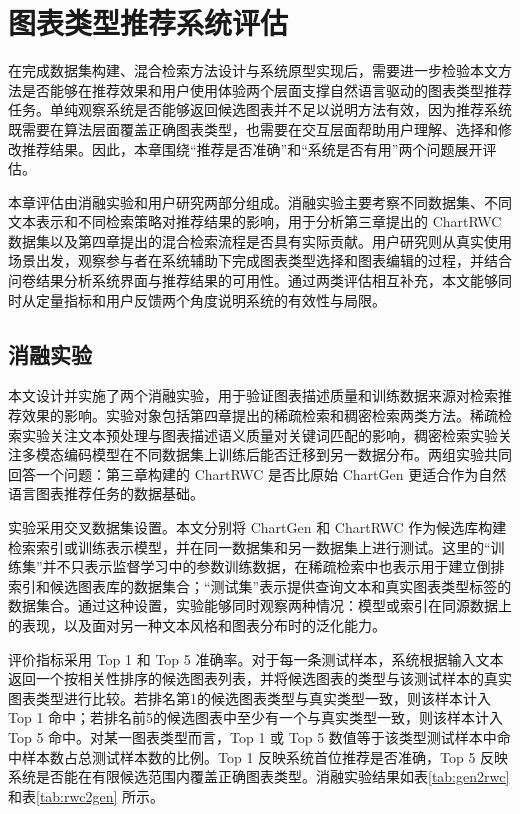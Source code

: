 \section{图表类型推荐系统评估}

在完成数据集构建、混合检索方法设计与系统原型实现后，需要进一步检验本文方法是否能够在推荐效果和用户使用体验两个层面支撑自然语言驱动的图表类型推荐任务。单纯观察系统是否能够返回候选图表并不足以说明方法有效，因为推荐系统既需要在算法层面覆盖正确图表类型，也需要在交互层面帮助用户理解、选择和修改推荐结果。因此，本章围绕“推荐是否准确”和“系统是否有用”两个问题展开评估。

本章评估由消融实验和用户研究两部分组成。消融实验主要考察不同数据集、不同文本表示和不同检索策略对推荐结果的影响，用于分析第三章提出的 ChartRWC 数据集以及第四章提出的混合检索流程是否具有实际贡献。用户研究则从真实使用场景出发，观察参与者在系统辅助下完成图表类型选择和图表编辑的过程，并结合问卷结果分析系统界面与推荐结果的可用性。通过两类评估相互补充，本文能够同时从定量指标和用户反馈两个角度说明系统的有效性与局限。

\subsection{消融实验}

本文设计并实施了两个消融实验，用于验证图表描述质量和训练数据来源对检索推荐效果的影响。实验对象包括第四章提出的稀疏检索和稠密检索两类方法。稀疏检索实验关注文本预处理与图表描述语义质量对关键词匹配的影响，稠密检索实验关注多模态编码模型在不同数据集上训练后能否迁移到另一数据分布。两组实验共同回答一个问题：第三章构建的 ChartRWC 是否比原始 ChartGen 更适合作为自然语言图表推荐任务的数据基础。

实验采用交叉数据集设置。本文分别将 ChartGen 和 ChartRWC 作为候选库构建检索索引或训练表示模型，并在同一数据集和另一数据集上进行测试。这里的“训练集”并不只表示监督学习中的参数训练数据，在稀疏检索中也表示用于建立倒排索引和候选图表库的数据集合；“测试集”表示提供查询文本和真实图表类型标签的数据集合。通过这种设置，实验能够同时观察两种情况：模型或索引在同源数据上的表现，以及面对另一种文本风格和图表分布时的泛化能力。

评价指标采用 Top 1 和 Top 5 准确率。对于每一条测试样本，系统根据输入文本返回一个按相关性排序的候选图表列表，并将候选图表的类型与该测试样本的真实图表类型进行比较。若排名第1的候选图表类型与真实类型一致，则该样本计入 Top 1 命中；若排名前5的候选图表中至少有一个与真实类型一致，则该样本计入 Top 5 命中。对某一图表类型而言，Top 1 或 Top 5 数值等于该类型测试样本中命中样本数占总测试样本数的比例。Top 1 反映系统首位推荐是否准确，Top 5 反映系统是否能在有限候选范围内覆盖正确图表类型。消融实验结果如表\ref{tab:gen2rwc} 和表\ref{tab:rwc2gen} 所示。

